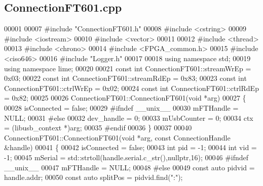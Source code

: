 \subsection{Connection\+F\+T601.\+cpp}
\label{ConnectionFT601_8cpp_source}

\begin{DoxyCode}
00001 
00007 \textcolor{preprocessor}{#include "ConnectionFT601.h"}
00008 \textcolor{preprocessor}{#include <cstring>}
00009 \textcolor{preprocessor}{#include <iostream>}
00010 \textcolor{preprocessor}{#include <vector>}
00011 
00012 \textcolor{preprocessor}{#include <thread>}
00013 \textcolor{preprocessor}{#include <chrono>}
00014 \textcolor{preprocessor}{#include <FPGA_common.h>}
00015 \textcolor{preprocessor}{#include <ciso646>}
00016 \textcolor{preprocessor}{#include "Logger.h"}
00017 
00018 \textcolor{keyword}{using namespace }std;
00019 \textcolor{keyword}{using namespace }lime;
00020 
00021 \textcolor{keyword}{const} \textcolor{keywordtype}{int} ConnectionFT601::streamWrEp = 0x03;
00022 \textcolor{keyword}{const} \textcolor{keywordtype}{int} ConnectionFT601::streamRdEp = 0x83;
00023 \textcolor{keyword}{const} \textcolor{keywordtype}{int} ConnectionFT601::ctrlWrEp = 0x02;
00024 \textcolor{keyword}{const} \textcolor{keywordtype}{int} ConnectionFT601::ctrlRdEp = 0x82;
00025 
00026 ConnectionFT601::ConnectionFT601(\textcolor{keywordtype}{void} *arg)
00027 \{
00028     isConnected = \textcolor{keyword}{false};
00029 \textcolor{preprocessor}{#ifndef \_\_unix\_\_}
00030     mFTHandle = NULL;
00031 \textcolor{preprocessor}{#else}
00032     dev\_handle = 0;
00033     mUsbCounter = 0;
00034     ctx = (libusb\_context *)arg;
00035 \textcolor{preprocessor}{#endif}
00036 \}
00037 
00040 ConnectionFT601::ConnectionFT601(\textcolor{keywordtype}{void} *arg, \textcolor{keyword}{const} ConnectionHandle &handle)
00041 \{
00042     isConnected = \textcolor{keyword}{false};
00043     \textcolor{keywordtype}{int} pid = -1;
00044     \textcolor{keywordtype}{int} vid = -1;
00045     mSerial = std::strtoll(handle.serial.c\_str(),\textcolor{keyword}{nullptr},16);
00046 \textcolor{preprocessor}{#ifndef \_\_unix\_\_}
00047     mFTHandle = NULL;
00048 \textcolor{preprocessor}{#else}
00049     \textcolor{keyword}{const} \textcolor{keyword}{auto} pidvid = handle.addr;
00050     \textcolor{keyword}{const} \textcolor{keyword}{auto} splitPos = pidvid.find(\textcolor{stringliteral}{":"});

\end{DoxyCode}
